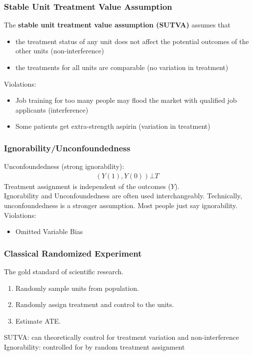 \documentclass[handout]{beamer}
\begin{document}
\begin{frame}
\frametitle{Stable Unit Treatment Value Assumption}
\pause
The {\bf stable unit treatment value assumption (SUTVA)} assumes that
\pause
\begin{itemize}
\item the treatment status of any unit does not affect the potential
outcomes of the other units (non-interference)
\pause
\item the treatments for all units are comparable (no variation in treatment) 
\end{itemize}
\bigskip
\pause
Violations: 
\pause
\begin{itemize}
\item Job training for too many people may flood the market with
qualified job applicants (interference) 
\pause
\item Some patients get extra-strength aspirin (variation in treatment)
\end{itemize}
\end{frame}

\begin{frame}
\frametitle{Ignorability/Unconfoundedness}
Unconfoundedness (strong ignorability): 
\begin{eqnarray*}
(Y(1), Y(0)) \bot T
\end{eqnarray*}
\pause
\bigskip
Treatment assignment is independent of the outcomes ($Y$). \\
\pause
\bigskip
Ignorability and Unconfoundedness are often used interchangeably. 
Technically, unconfoundedness is a stronger assumption.  Most people
just say ignorability.\\
\bigskip
\pause
Violations:
\pause
\begin{itemize}
\item Omitted Variable Bias
\end{itemize}
\end{frame}

\begin{frame}
\frametitle{Classical Randomized Experiment}
\pause
The gold standard of scientific research.\\
\pause
\bigskip
\begin{enumerate}
\item Randomly sample units from population.\\
\pause
\item Randomly assign treatment and control to the units.\\
\pause
\item Estimate ATE.
\end{enumerate}
\pause
\bigskip
SUTVA: can theoretically control for treatment variation and
non-interference \\
\pause
\bigskip
Ignorability: controlled for by random treatment assignment
\end{frame}
\end{document}
